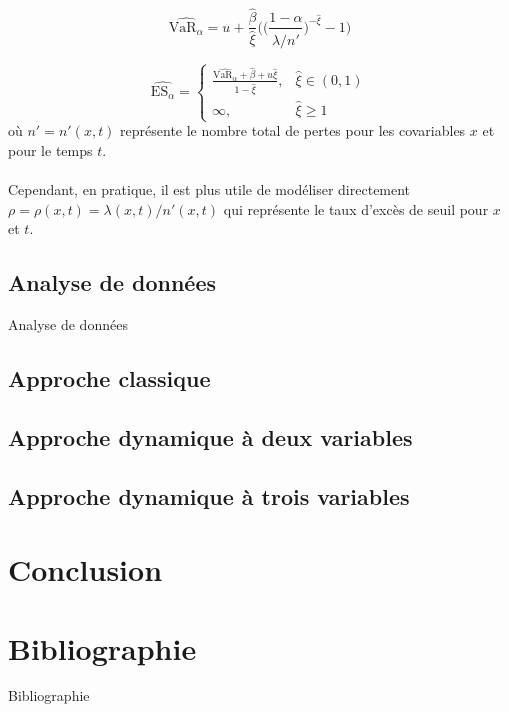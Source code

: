 \documentclass[aspectratio=169, 12pt, french]{beamer}
\begin{document}
\begin{frame}
\begin{equation}
\widehat{\text{VaR}_\alpha} = u + \frac{\hat\beta}{\hat\xi} \Bigg(\Bigg( \frac{1-\alpha}{\hat\lambda/n'}\Bigg)^{-\hat\xi} -1 \Bigg)
\end{equation}

\begin{equation}
\widehat{\text{ES}_\alpha} =
\begin{cases}
\frac{\widehat{\text{VaR}_\alpha} + \hat\beta + u\hat\xi}{1-\hat\xi}, & \hat{\xi} \in (0,1) \\
\infty, & \hat\xi 	\ge 1
\end{cases}
\end{equation}
où $n' = n'(x,t)$ représente le nombre total de pertes pour les covariables $x$ et pour le temps $t$.\\~\\ Cependant, en pratique, il est plus utile de modéliser directement $\rho = \rho(x, t) = \lambda(x,t)/n'(x, t)$ qui représente le taux d'excès de seuil pour $x$ et $t$.
\end{frame}

\subsection{Analyse de données}

\begin{frame}{Analyse de données}

\end{frame}

\subsection{Approche classique} 

\subsection{Approche dynamique à deux variables}

\subsection{Approche dynamique à trois variables}


\section{Conclusion}

\section*{Bibliographie}
\nocite{*}

\begin{frame}[allowframebreaks]{Bibliographie}

\end{frame}
\end{document}
